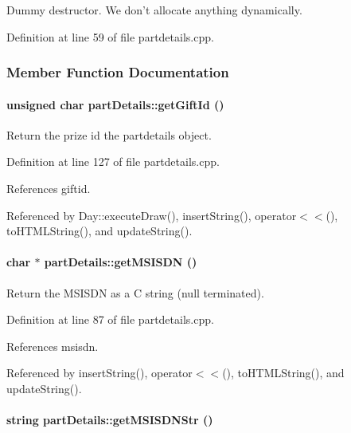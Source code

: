 Dummy destructor. We don't allocate anything dynamically. 

Definition at line 59 of file partdetails.cpp.

\subsubsection{Member Function Documentation}
\hypertarget{classpartDetails_partDetailsa10}{
\paragraph[getGiftId]{\setlength{\rightskip}{0pt plus 5cm}unsigned char part\-Details::get\-Gift\-Id ()}\hfill}
\label{classpartDetails_partDetailsa10}


Return the prize id the partdetails object. 

Definition at line 127 of file partdetails.cpp.

References giftid.

Referenced by Day::execute\-Draw(), insert\-String(), operator$<$$<$(), to\-HTMLString(), and update\-String().\hypertarget{classpartDetails_partDetailsa5}{
\paragraph[getMSISDN]{\setlength{\rightskip}{0pt plus 5cm}char $\ast$ part\-Details::get\-MSISDN ()}\hfill}
\label{classpartDetails_partDetailsa5}


Return the MSISDN as a C string (null terminated). 

Definition at line 87 of file partdetails.cpp.

References msisdn.

Referenced by insert\-String(), operator$<$$<$(), to\-HTMLString(), and update\-String().\hypertarget{classpartDetails_partDetailsa6}{
\paragraph[getMSISDNStr]{\setlength{\rightskip}{0pt plus 5cm}string part\-Details::get\-MSISDNStr ()}\hfill}
\label{classpartDetails_partDetailsa6}


